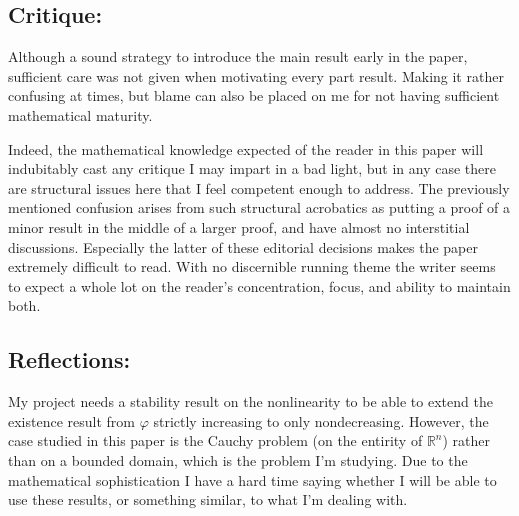 \documentclass[11pt, a4paper]{article}
\begin{document}
\subsection{Critique:}
Although a sound strategy to introduce the main result early in the paper, sufficient care was not given when motivating every part result. Making it rather confusing at times, but blame can also be placed on me for not having sufficient mathematical maturity.

Indeed, the mathematical knowledge expected of the reader in this paper will indubitably cast any critique I may impart in a bad light, but in any case there are structural issues here that I feel competent enough to address. The previously mentioned confusion arises from such structural acrobatics as putting a proof of a minor result in the middle of a larger proof, and have almost no interstitial discussions. Especially the latter of these editorial decisions makes the paper extremely difficult to read. With no discernible running theme the writer seems to expect a whole lot on the reader's concentration, focus, and ability to maintain both.

\subsection{Reflections:}
My project needs a stability result on the nonlinearity to be able to extend the existence result from $\varphi$ strictly increasing to only nondecreasing. However, the case studied in this paper is the Cauchy problem (on the entirity of $\mathbb{R}^n$) rather than on a bounded domain, which is the problem I'm studying. Due to the mathematical sophistication I have a hard time saying whether I will be able to use these results, or something similar, to what I'm dealing with.


 





\newpage


\end{document}
